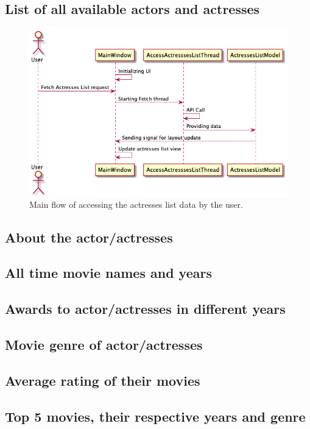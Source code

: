 \documentclass[12pt]{article}
\begin{document}
\subsection{List of all available actors and actresses} \label{list-actors}
\begin{figure}[H]
      \begin{center}
            \includegraphics[scale=0.4]{img/fetch_actresses_flow.png}
            \caption{\label{fig:fetch-actresses-flow} Main flow of accessing the actresses list data
            by the user.}
      \end{center}
\end{figure}

\subsection{About the actor/actresses} \label{about}

\subsection{All time movie names and years} \label{movies}

\subsection{Awards to actor/actresses in different years} \label{awards}

\subsection{Movie genre of actor/actresses} \label{genre}

\subsection{Average rating of their movies} \label{average-rating}

\subsection{Top 5 movies, their respective years and genre} \label{top-movies}
\end{document}
